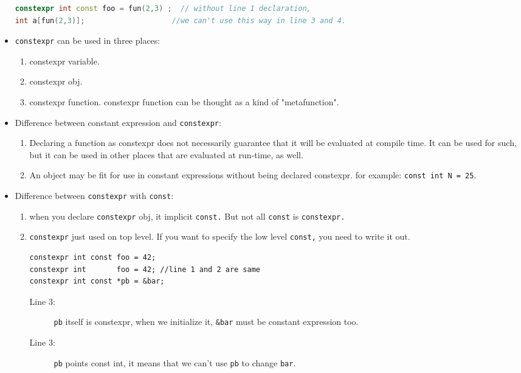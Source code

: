 \documentclass[a4paper,11pt,twoside]{book}
\begin{document}
\begin{itemize}
\begin{lstlisting}[frame=single, language=c++]
constexpr int const foo = fun(2,3) ;  // without line 1 declaration, 
int a[fun(2,3)];                    //we can't use this way in line 3 and 4.
\end{lstlisting}
		
	
	\item \texttt{constexpr} can be used in three places: 
	\begin{enumerate}
		\item constexpr variable.
		\item constexpr obj.
		\item constexpr function. constexpr function can be thought as a kind of "metafunction".
	\end{enumerate}
	
	
	\item Difference between constant expression and \texttt{constexpr}:
	\begin{enumerate}
		\item Declaring a function as constexpr does not necessarily guarantee that it will be evaluated at compile time. It can be used for such, but it can be used in other places that are evaluated at run-time, as well.
		
		\item An object may be fit for use in constant expressions without being declared constexpr. for example: \texttt{const int N = 25}.
	\end{enumerate}
	
	\item Difference between \texttt{constexpr} with \texttt{const}:
	\begin{enumerate}
		\item when you declare \texttt{constexpr} obj, it implicit \texttt{const.} But not all \texttt{const} is \texttt{constexpr.}
		
		\item \texttt{constexpr} just used on top level. If you want to specify the low level \texttt{const,} you need to write it out.
\begin{lstlisting}
constexpr int const foo = 42;
constexpr int       foo = 42; //line 1 and 2 are same 
constexpr int const *pb = &bar; 
\end{lstlisting}
		\begin{description}
			\item[Line 3:] \texttt{pb} itself is constexpr, when we initialize it, \texttt{\&bar} must be constant expression too.
			\item[Line 3:] \texttt{pb} points const int, it means that we can't use \texttt{pb} to change \texttt{bar}.
		\end{description}
	\end{enumerate}
	
\end{itemize}
\end{document}
